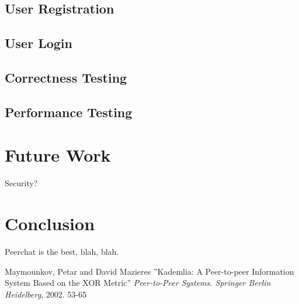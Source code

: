 \documentclass{article}
\begin{document}
\subsection{User Registration}
\subsection{User Login}
\subsection{Correctness Testing}
\subsection{Performance Testing}

\section{Future Work}

Security?

\section{Conclusion}

Peerchat is the best, blah, blah.

\begin{thebibliography}{99}
   Maymounkov, Petar and David Mazieres
   ''Kademlia: A Peer-to-peer Information System Based on the XOR Metric''
   \textit{Peer-to-Peer Systems. Springer Berlin Heidelberg}, 2002. 53-65
 
\end{thebibliography}
\end{document}
